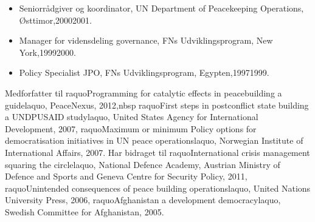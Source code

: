 \documentclass[11pt, a4paper]{awesome-cv}
\begin{document}
\begin{cvletter}
\begin{itemize}
\item Seniorrådgiver og koordinator, UN Department of Peacekeeping Operations, Østtimor,20002001.
\item Manager for vidensdeling governance, FNs Udviklingsprogram, New York,19992000.
\item Policy Specialist JPO, FNs Udviklingsprogram, Egypten,19971999.
\end{itemize}
Medforfatter til raquoProgramming for catalytic effects in peacebuilding  a guidelaquo, PeaceNexus, 2012,nbsp raquoFirst steps in postconflict state building a UNDPUSAID studylaquo, United States Agency for International Development, 2007, raquoMaximum or minimum Policy options for democratisation initiatives in UN peace operationslaquo, Norwegian Institute of International Affairs, 2007. Har bidraget til raquoInternational crisis management squaring the circlelaquo, National Defence Academy, Austrian Ministry of Defence and Sports and Geneva Centre for Security Policy, 2011, raquoUnintended consequences of peace building operationslaquo, United Nations University Press, 2006, raquoAfghanistan  a development democracylaquo, Swedish Committee for Afghanistan, 2005.

\end{cvletter}
\end{document}
